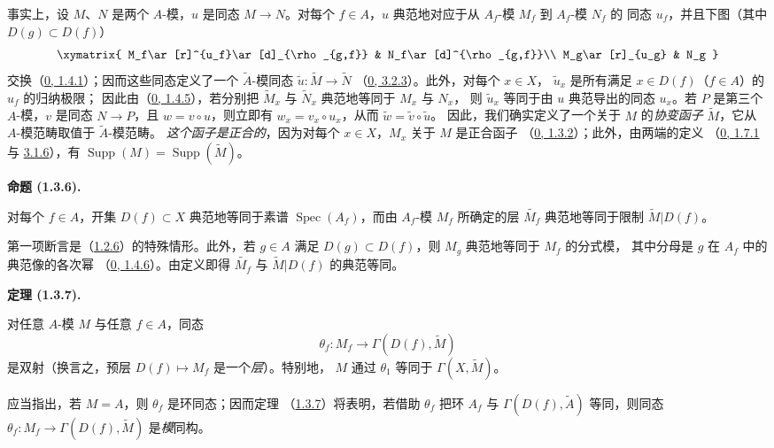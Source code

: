\documentclass[UTF8,fontset=none,11pt,oneside,openany]{ctexbook}
\newenvironment{theorem}[1][]{%
  \par\medskip\noindent\textbf{定理 (#1).}\ %
}{\par}
\newenvironment{proposition}[1][]{%
  \par\medskip\noindent\textbf{命题 (#1).}\ %
}{\par}
\newcommand{\oldpage}[2][]{%
  \hypertarget{ega-source-page-#1-#2}{}%
  \marginnote{\scriptsize\textbf{#1}~|~#2}\ignorespaces}
\let\EGAOriginalLabel\label
\renewcommand{\label}[1]{\phantomsection\EGAOriginalLabel{#1}}
\begin{document}
事实上，设 $M$、$N$ 是两个 $A$-模，$u$ 是同态 $M\to N$。对每个
$f\in A$，$u$ 典范地对应于从 $A_f$-模 $M_f$ 到 $A_f$-模 $N_f$ 的
同态 $u_f$，并且下图（其中 $D(g)\subset D(f)$）
\[
  \xymatrix{
    M_f\ar[r]^{u_f}\ar[d]_{\rho_{g,f}} & N_f\ar[d]^{\rho_{g,f}}\\
    M_g\ar[r]_{u_g} & N_g
  }
\]
交换（\hyperref[0.1.4.1-fr]{0, 1.4.1}）；因而这些同态定义了一个
$\widetilde{A}$-模同态 $\widetilde{u}:\widetilde{M}\to\widetilde{N}$
（\hyperref[0.3.2.3-fr]{0, 3.2.3}）。此外，对每个 $x\in X$，
$\widetilde{u}_x$ 是所有满足 $x\in D(f)$（$f\in A$）的 $u_f$ 的归纳极限；
因此由（\hyperref[0.1.4.5-fr]{0, 1.4.5}），若分别把
$\widetilde{M}_x$ 与 $\widetilde{N}_x$ 典范地等同于 $M_x$ 与 $N_x$，
则 $\widetilde{u}_x$ 等同于由 $u$ 典范导出的同态 $u_x$。若 $P$ 是第三个
$A$-模，$v$ 是同态 $N\to P$，且 $w=v\circ u$，则立即有
$w_x=v_x\circ u_x$，从而 $\widetilde{w}=\widetilde{v}\circ\widetilde{u}$。
因此，我们确实定义了一个关于 $M$ 的\emph{协变函子}
$\widetilde{M}$，它从 $A$-模范畴取值于 $\widetilde{A}$-模范畴。
\emph{这个函子是正合的}，因为对每个 $x\in X$，$M_x$ 关于 $M$ 是正合函子
（\hyperref[0.1.3.2-fr]{0, 1.3.2}）；此外，由两端的定义
（\hyperref[0.1.7.1-fr]{0, 1.7.1} 与
\hyperref[0.3.1.6-fr]{3.1.6}），有
$\operatorname{Supp}(M)=\operatorname{Supp}(\widetilde{M})$。

\oldpage[I]{86}
\begin{proposition}[1.3.6]
\label{I.1.3.6-fr}
对每个 $f\in A$，开集 $D(f)\subset X$ 典范地等同于素谱
$\operatorname{Spec}(A_f)$，而由 $A_f$-模 $M_f$ 所确定的层
$\widetilde{M_f}$ 典范地等同于限制 $\widetilde{M}|D(f)$。
\end{proposition}

第一项断言是（\hyperref[I.1.2.6-fr]{1.2.6}）的特殊情形。此外，若
$g\in A$ 满足 $D(g)\subset D(f)$，则 $M_g$ 典范地等同于 $M_f$ 的分式模，
其中分母是 $g$ 在 $A_f$ 中的典范像的各次幂
（\hyperref[0.1.4.6-fr]{0, 1.4.6}）。由定义即得
$\widetilde{M_f}$ 与 $\widetilde{M}|D(f)$ 的典范等同。

\begin{theorem}[1.3.7]
\label{I.1.3.7-fr}
对任意 $A$-模 $M$ 与任意 $f\in A$，同态
\[
  \theta_f:M_f\longrightarrow\Gamma(D(f),\widetilde{M})
\]
是双射（换言之，预层 $D(f)\mapsto M_f$ 是一个\emph{层}）。特别地，
$M$ 通过 $\theta_1$ 等同于 $\Gamma(X,\widetilde{M})$。
\end{theorem}

应当指出，若 $M=A$，则 $\theta_f$ 是环同态；因而定理
（\hyperref[I.1.3.7-fr]{1.3.7}）将表明，若借助 $\theta_f$ 把环
$A_f$ 与 $\Gamma(D(f),\widetilde{A})$ 等同，则同态
$\theta_f:M_f\to\Gamma(D(f),\widetilde{M})$ 是\emph{模}同构。
\end{document}
